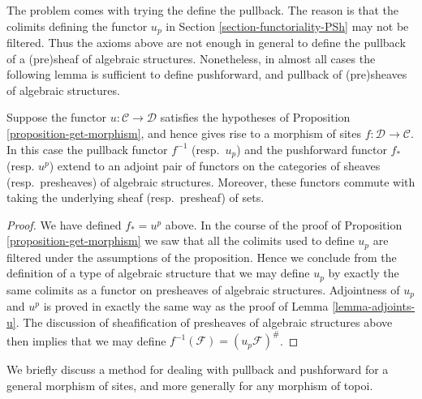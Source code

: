 \noindent
The problem comes with trying the define the pullback.
The reason is that the colimits defining
the functor $u_p$ in Section \ref{section-functoriality-PSh}
may not be filtered. Thus the axioms above are not enough in
general to define the pullback of a (pre)sheaf of algebraic
structures. Nonetheless, in almost all cases the following
lemma is sufficient to define pushforward, and pullback
of (pre)sheaves of algebraic structures.

\begin{lemma}
\label{lemma-push-pull-good-case}
Suppose the functor $u : \mathcal{C} \to \mathcal{D}$ satisfies
the hypotheses of Proposition \ref{proposition-get-morphism},
and hence gives rise to a morphism of sites
$f : \mathcal{D} \to \mathcal{C}$. In this case
the pullback functor $f^{-1}$ (resp.\ $u_p$) and the pushforward
functor $f_*$ (resp. $u^p$) extend to an adjoint pair of functors on
the categories of sheaves (resp.\ presheaves)  of algebraic structures.
Moreover, these functors commute with taking
the underlying sheaf (resp.\ presheaf) of sets.
\end{lemma}

\begin{proof}
We have defined $f_* = u^p$ above.
In the course of the proof of Proposition \ref{proposition-get-morphism}
we saw that all the colimits used to define $u_p$ are
filtered under the assumptions of the proposition.
Hence we conclude from the definition of a type of
algebraic structure that we may define $u_p$ by exactly
the same colimits as a functor on presheaves of algebraic structures.
Adjointness of $u_p$ and $u^p$ is proved in exactly the
same way as the proof of Lemma \ref{lemma-adjoints-u}.
The discussion of sheafification of presheaves of
algebraic structures above then implies that we may define
$f^{-1}(\mathcal{F}) = (u_p\mathcal{F})^\#$.
\end{proof}

\noindent
We briefly discuss a method for dealing with pullback and
pushforward for a general morphism of sites, and more generally
for any morphism of topoi.

